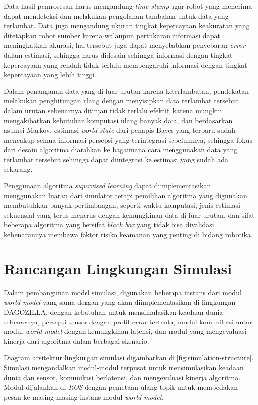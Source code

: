 Data hasil pemrosesan harus mengandung \textit{time-stamp} agar robot yang menerima dapat mendeteksi dan melakukan pengolahan tambahan untuk data yang terlambat. Data juga mengandung ukuran tingkat kepercayaan keakuratan yang ditetapkan robot sumber karena walaupun pertukaran informasi dapat meningkatkan akurasi, hal tersebut juga dapat menyebabkan penyebaran \textit{error} dalam estimasi, sehingga harus didesain sehingga informasi dengan tingkat kepercayaan yang rendah tidak terlalu mempengaruhi informasi dengan tingkat kepercayaan yang lebih tinggi.

Dalam penanganan data yang di luar urutan karena keterlambatan, pendekatan melakukan penghitungan ulang dengan menyisipkan data terlambat tersebut dalam urutan sebenarnya ditinjau tidak terlalu efektif, karena mungkin mengakibatkan kebutuhan komputasi ulang banyak data, dan berdasarkan asumsi Markov, estimasi \textit{world state} dari penapis Bayes yang terbaru sudah mencakup semua informasi persepsi yang terintegrasi sebelumnya, sehingga fokus dari desain algoritma diarahkan ke bagaimana cara menggunakan data yang terlambat tersebut sehingga dapat diintegrasi ke estimasi yang sudah ada sekarang.

Penggunaan algoritma \textit{supervised learning} dapat diimplementasikan menggunakan luaran dari simulator tetapi pemilihan algoritma yang digunakan membutuhkan banyak pertimbangan, seperti waktu komputasi, jenis estimasi sekuensial yang terus-menerus dengan kemungkinan data di luar urutan, dan sifat beberapa algoritma yang bersifat \textit{black box} yang tidak bisa divalidasi kebenarannya membawa faktor risiko keamanan yang penting di bidang robotika.

\section{Rancangan Lingkungan Simulasi}

Dalam pembangunan model simulasi, digunakan beberapa instans dari modul \textit{world model} yang sama dengan yang akan diimplementasikan di lingkungan DAGOZILLA, dengan kebutuhan untuk mensimulasikan keadaan dunia sebenarnya, persepsi sensor dengan profil \textit{error} tertentu, modul komunikasi antar modul \textit{world model} dengan kemungkinan latensi, dan modul yang mengevaluasi kinerja dari algoritma dalam berbagai skenario.

Diagram arsitektur lingkungan simulasi digambarkan di \ref{fig:simulation-structure}. Simulasi mengandalkan modul-modul terpusat untuk mensimulasikan keadaan dunia dan sensor, komunikasi berlatensi, dan mengevaluasi kinerja algoritma. Modul dijalankan di \textit{ROS} dengan pemetaan ulang topik untuk membedakan pesan ke masing-masing instans modul \textit{world model}.

